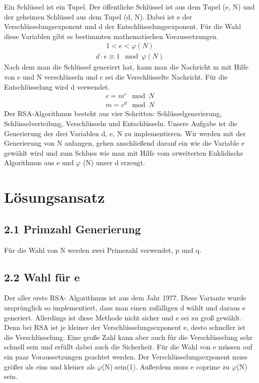 \documentclass[course=asp]{aspdoc}
\begin{document}
Ein Schlüssel ist ein Tupel. Der öffentliche Schlüssel ist aus dem Tupel (e, N) und der geheimen Schlüssel aus dem Tupel (d, N). Dabei ist e der Verschlüsselungsexponent und d der Entschlüsselungsexponent. Für die Wahl diese Variablen gibt es bestimmten mathematischen Voraussetzungen. 
\begin{align}
1 < e < \varphi (N)
\end{align}
\begin{align}
d \cdot e \equiv 1 \mod \varphi (N)
\end{align}
Nach dem man die Schlüssel generiert hat, kann man die Nachricht m mit Hilfe von e und N verschlüsseln und c sei die Verschlüsselte Nachricht. Für die Entschlüsselung wird d verwendet.
\begin{align}
c {=} m^e \mod N
\end{align} 
\begin{align}
m {=} c^d \mod N
\end{align} 
Der RSA-Algorithmus besteht aus vier Schritten: Schlüsselgenerierung, Schlüsselverteilung, Verschlüsseln und Entschlüsseln. Unsere Aufgabe ist die Generierung der drei Variablen d, e, N zu implementieren. Wir werden mit der Generierung von N anfangen, gehen anschließend darauf ein wie die Variable e gewählt wird und zum Schluss wie man mit Hilfe vom erweiterten Euklidische Algorithmus aus e und $\varphi $ (N) unser d erzeugt.

\section{Lösungsansatz}  
\subsection*{2.1 Primzahl Generierung }
Für die Wahl von N werden zwei Primezahl verwendet, p und q.

\subsection*{2.2 Wahl für e }
Der aller erste RSA- Algorithmus ist aus dem Jahr 1977. Diese Variante wurde ursprünglich so implementiert, dass man einen zufälligen d wählt und daraus e generiert. Allerdings ist diese Methode nicht sicher und e sei zu groß gewählt. Denn bei RSA ist je kleiner der Verschlüsselungsexponent e, desto schneller ist die Verschlüsselung. Eine große Zahl kann aber auch für die Verschlüsselung sehr schnell sein und erfüllt dabei auch die Sicherheit. Für die Wahl von e müssen auf ein paar Voraussetzungen geachtet werden. Der Verschlüsselungsexponent muss größer als eins und kleiner als $\varphi $(N) sein(1). Außerdem muss e coprime zu $\varphi $(N) sein.
\end{document}
